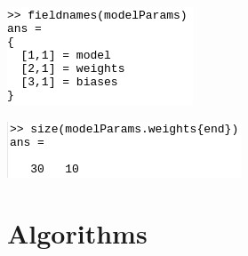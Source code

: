 \includegraphics[scale=0.8]{Bilder/structArray.png}
 
 \includegraphics[scale=0.8]{Bilder/weightsMat.png}

\section{Algorithms}\label{Algorithms}

